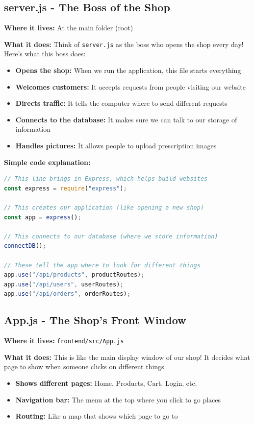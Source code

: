 \documentclass[12pt]{article}
\begin{document}
\subsection{server.js - The Boss of the Shop}

\textbf{Where it lives:} At the main folder (root)

\textbf{What it does:}
Think of \texttt{server.js} as the boss who opens the shop every day! Here's what this boss does:

\begin{itemize}
    \item \textbf{Opens the shop:} When we run the application, this file starts everything
    \item \textbf{Welcomes customers:} It accepts requests from people visiting our website
    \item \textbf{Directs traffic:} It tells the computer where to send different requests
    \item \textbf{Connects to the database:} It makes sure we can talk to our storage of information
    \item \textbf{Handles pictures:} It allows people to upload prescription images
\end{itemize}

\textbf{Simple code explanation:}
\begin{lstlisting}[language=JavaScript]
// This line brings in Express, which helps build websites
const express = require("express");

// This creates our application (like opening a new shop)
const app = express();

// This connects to our database (where we store information)
connectDB();

// These tell the app where to look for different things
app.use("/api/products", productRoutes);
app.use("/api/users", userRoutes);
app.use("/api/orders", orderRoutes);
\end{lstlisting}

\subsection{App.js - The Shop's Front Window}

\textbf{Where it lives:} \texttt{frontend/src/App.js}

\textbf{What it does:}
This is like the main display window of our shop! It decides what page to show when someone clicks on different things.

\begin{itemize}
    \item \textbf{Shows different pages:} Home, Products, Cart, Login, etc.
    \item \textbf{Navigation bar:} The menu at the top where you click to go places
    \item \textbf{Routing:} Like a map that shows which page to go to
\end{itemize}
\end{document}
